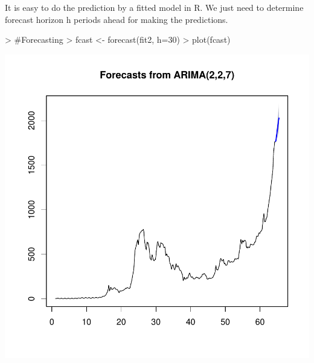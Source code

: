 \documentclass{article}
\begin{document}
It is easy to do the prediction by a fitted model in R. We just need to determine forecast horizon h periods ahead for making the predictions.
\begin{Schunk}
\begin{Sinput}
> #Forecasting
> fcast <- forecast(fit2, h=30)
> plot(fcast)
\end{Sinput}
\end{Schunk}
\includegraphics{Report-019}
\end{document}
